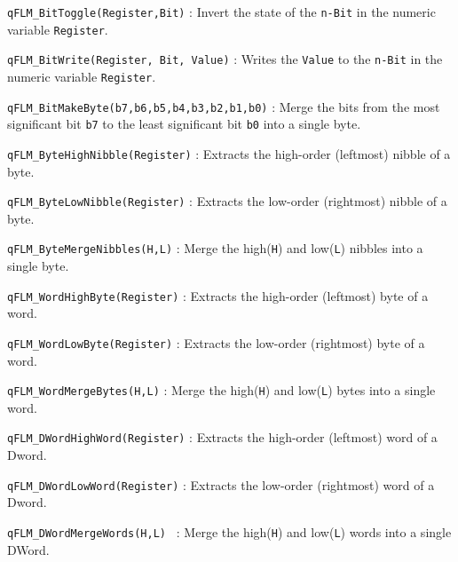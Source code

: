 \documentclass{article}
\begin{document}
\lstinline{qFLM_BitToggle(Register,Bit)} : Invert the state of the \lstinline{n-Bit} in the numeric variable \lstinline{Register}.

\noindent\hrulefill

\lstinline{qFLM_BitWrite(Register, Bit, Value)} : Writes the \lstinline{Value} to the \lstinline{n-Bit} in the numeric variable \lstinline{Register}.

\noindent\hrulefill

\lstinline{qFLM_BitMakeByte(b7,b6,b5,b4,b3,b2,b1,b0)} : Merge the bits from the most significant bit \lstinline{b7} to the least significant bit \lstinline{b0} into a single byte.

\noindent\hrulefill

\lstinline{qFLM_ByteHighNibble(Register)} : Extracts the  high-order (leftmost) nibble of a byte.

\noindent\hrulefill

\lstinline{qFLM_ByteLowNibble(Register)} : Extracts the low-order (rightmost) nibble of a byte.

\noindent\hrulefill

\lstinline{qFLM_ByteMergeNibbles(H,L)} :  Merge the high(\lstinline{H}) and low(\lstinline{L}) nibbles into a single byte.

\noindent\hrulefill

\lstinline{qFLM_WordHighByte(Register)} : Extracts the high-order (leftmost) byte of a word.

\noindent\hrulefill

\lstinline{qFLM_WordLowByte(Register)} : Extracts the low-order (rightmost) byte of a word.

\noindent\hrulefill

\lstinline{qFLM_WordMergeBytes(H,L)} : Merge the high(\lstinline{H}) and low(\lstinline{L}) bytes into a single word.

\noindent\hrulefill

\lstinline{qFLM_DWordHighWord(Register)} : Extracts the high-order (leftmost) word of a Dword.

\noindent\hrulefill

\lstinline{qFLM_DWordLowWord(Register)} : Extracts the low-order (rightmost) word of a Dword.

\noindent\hrulefill

\lstinline{qFLM_DWordMergeWords(H,L) } : Merge the high(\lstinline{H}) and low(\lstinline{L}) words into a single DWord.

\noindent\hrulefill
\end{document}
